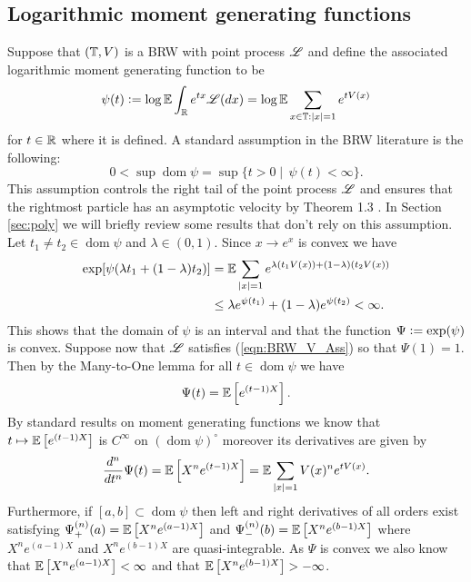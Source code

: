 \subsection{Logarithmic moment generating functions}\label{subsec:moment_generating_functions}
Suppose that $(\mathbb{T}, V)$ is a BRW with point process $\mathscr{L}$ and define the associated logarithmic moment generating function to be
\begin{equation}\nonumber
\psi(t) \vcentcolon= \log \mathbb{E} \int_{\mathbb{R}} e^{t x} \mathscr{L}(dx) = \log \mathbb{E} \sum\limits_{x \in \mathbb{T}: |x|=1} e^{t V(x)} 
\end{equation}
for $t \in \mathbb{R}$ where it is defined. A standard assumption in the BRW literature is the following: 
\begin{equation}\label{eqn:BRW_generator_finite}
0 < \sup\operatorname*{dom} \psi = \sup\{ t > 0 \mid\, \psi(t) < \infty \}. 
\end{equation}
This assumption controls the right tail of the point process $\mathscr{L}$ and ensures that the rightmost particle has an asymptotic velocity by Theorem 1.3 \cite{shi2015branching}. In Section \ref{sec:poly} we will briefly review some results that don't rely on this assumption. Let $t_1 \neq t_2 \in \operatorname*{dom} \psi$ and $\lambda \in (0, 1)$. Since $x \to e^x$ is convex we have
\begin{align*}
\exp [\psi(\lambda t_1 + (1 - \lambda) t_2)] &= \mathbb{E} \sum\limits_{|x| = 1} e^{\lambda (t_1 V(x))+ (1 - \lambda) (t_2 V(x))} \\
									  &\leq	\lambda e^{\psi(t_1)} + (1 - \lambda)e^{\psi(t_2)} < \infty. 
\end{align*} 
This shows that the domain of $\psi$ is an interval and that the function $\Psi \vcentcolon= \exp(\psi)$ is convex. Suppose now that $\mathscr{L}$ satisfies (\ref{eqn:BRW_V_Ass}) so that $\Psi(1) = 1$. Then by the Many-to-One lemma for all $t \in \operatorname*{dom} \psi$ we have
\begin{equation}
\Psi(t) = \mathbb{E}\left[ e^{(t - 1)X} \right]. 
\end{equation}
By standard results on moment generating functions we know that $t \mapsto \mathbb{E}\left[ e^{(t - 1)X} \right]$ is $C^\infty$ on $(\operatorname*{dom} \psi)^\circ$ moreover
its derivatives are given by 
\begin{equation}
\frac{d^n}{dt^n} \Psi(t) = \mathbb{E}\left[ X^n e^{(t - 1)X} \right] = \mathbb{E} \sum\limits_{|x| = 1} V(x)^n e^{t V(x)}. 
\end{equation}
Furthermore, if $[a, b] \subset \operatorname*{dom} \psi$ then left and right derivatives of all orders exist satisfying $\Psi^{(n)}_+(a) = \mathbb{E}\left[ X^n e^{(a - 1)X} \right]$ and $\Psi^{(n)}_-(b) = \mathbb{E}\left[ X^n e^{(b - 1)X} \right]$ where $X^n e^{(a - 1)X}$ and $X^n e^{(b - 1)X}$ are quasi-integrable. As $\Psi$ is convex we also know that ${\mathbb{E}\left[ X^n e^{(a - 1)X} \right] < \infty}$ and that $\mathbb{E}\left[ X^n e^{(b - 1)X} \right] > -\infty$. 





